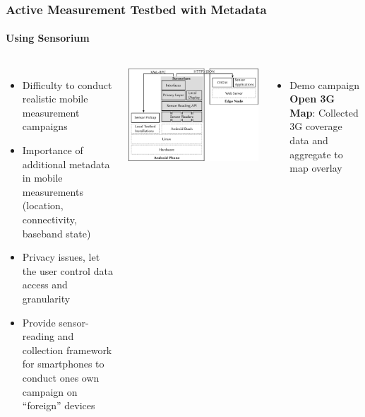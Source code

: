\documentclass{beamer}
\begin{document}
\begin{frame}
	\frametitle{Active Measurement Testbed with Metadata}
	\framesubtitle{Using Sensorium}

	\begin{columns}[T]
			\begin{itemize}
				\item Difficulty to conduct realistic mobile measurement campaigns
				\item Importance of additional metadata in mobile measurements (location, connectivity, baseband state)
				\item Privacy issues, let the user control data access and granularity
				\item Provide sensor-reading and collection framework for smartphones to conduct ones own campaign on ``foreign'' devices
			\end{itemize}

			\includegraphics[width=\columnwidth]{../../chapters/06-mobilestreamingmeasurements/images/sensorium-arch.pdf}\\
			\begin{itemize}
				\item Demo campaign \textbf{Open 3G Map}: Collected 3G coverage data and aggregate to map overlay
			\end{itemize}
	\end{columns}

\end{frame}
\end{document}

